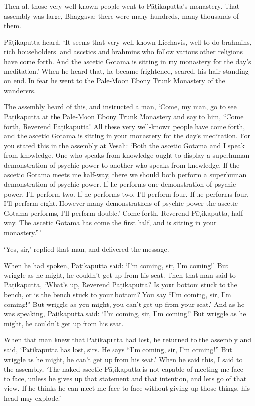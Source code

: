 \documentclass[12pt,openany]{book}%
\begin{document}
Then all those very well-known people went to \textsanskrit{Pāṭikaputta}’s monastery. That assembly was large, Bhaggava; there were many hundreds, many thousands of them. 

\textsanskrit{Pāṭikaputta} heard, ‘It seems that very well-known Licchavis, well-to-do brahmins, rich householders, and ascetics and brahmins who follow various other religions have come forth. And the ascetic Gotama is sitting in my monastery for the day’s meditation.’ When he heard that, he became frightened, scared, his hair standing on end. In fear he went to the Pale-Moon Ebony Trunk Monastery of the wanderers. 

The assembly heard of this, and instructed a man, ‘Come, my man, go to see \textsanskrit{Pāṭikaputta} at the Pale-Moon Ebony Trunk Monastery and say to him, “Come forth, Reverend \textsanskrit{Pāṭikaputta}! All these very well-known people have come forth, and the ascetic Gotama is sitting in your monastery for the day’s meditation. For you stated this in the assembly at \textsanskrit{Vesālī}: ‘Both the ascetic Gotama and I speak from knowledge. One who speaks from knowledge ought to display a superhuman demonstration of psychic power to another who speaks from knowledge. If the ascetic Gotama meets me half-way, there we should both perform a superhuman demonstration of psychic power. If he performs one demonstration of psychic power, I’ll perform two. If he performs two, I’ll perform four. If he performs four, I’ll perform eight. However many demonstrations of psychic power the ascetic Gotama performs, I’ll perform double.’ Come forth, Reverend \textsanskrit{Pāṭikaputta}, half-way. The ascetic Gotama has come the first half, and is sitting in your monastery.”’ 

‘Yes, sir,’ replied that man, and delivered the message. 

When he had spoken, \textsanskrit{Pāṭikaputta} said: ‘I’m coming, sir, I’m coming!’ But wriggle as he might, he couldn’t get up from his seat. Then that man said to \textsanskrit{Pāṭikaputta}, ‘What’s up, Reverend \textsanskrit{Pāṭikaputta}? Is your bottom stuck to the bench, or is the bench stuck to your bottom? You say “I’m coming, sir, I’m coming!” But wriggle as you might, you can’t get up from your seat.’ And as he was speaking, \textsanskrit{Pāṭikaputta} said: ‘I’m coming, sir, I’m coming!’ But wriggle as he might, he couldn’t get up from his seat. 

When that man knew that \textsanskrit{Pāṭikaputta} had lost, he returned to the assembly and said, ‘\textsanskrit{Pāṭikaputta} has lost, sirs. He says “I’m coming, sir, I’m coming!” But wriggle as he might, he can’t get up from his seat.’ When he said this, I said to the assembly, ‘The naked ascetic \textsanskrit{Pāṭikaputta} is not capable of meeting me face to face, unless he gives up that statement and that intention, and lets go of that view. If he thinks he can meet me face to face without giving up those things, his head may explode.’ 
\end{document}
